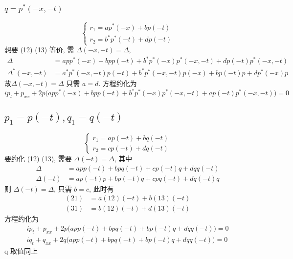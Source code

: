 \subsubsection{$ q = p^{*}(-x,-t) $}
\begin{equation*}
    \begin{cases}
        r_1 = ap^{*}(-x) + bp(-t) \\
        r_2 = b^{*}p^{*}(-t) + dp(-t) 
    \end{cases}
\end{equation*}
想要 (12) (13) 等价, 需 $ \Delta(-x,-t) = \Delta $,
\begin{equation*}
    \begin{aligned}
        \Delta &= app^{*}(-x) + bpp(-t) + b^{*}p^{*}(-x)p^{*}(-x,-t) + dp(-t)p^{*}(-x,-t) \\
        \Delta^{*}(-x,-t) &= a^{*}p^{*}(-x,-t)p(-t) + b^{*}p^{*}(-x,-t)p(-x) + bp(-t)p + dp^{*}(-x)p   
    \end{aligned}
\end{equation*}
故$ \Delta(-x,-t) = \Delta $ 只需 $ a = d $. 方程约化为
\begin{equation*}
    ip_t + p_{xx} + 2p \big( app^{*}(-x) + bpp(-t) + b^{*}p^{*}(-x)p^{*}(-x,-t) + ap(-t)p^{*}(-x,-t) \big) = 0
\end{equation*}

\subsection{$ p_1 = p(-t), q_1 = q(-t) $}
\begin{equation}
    \begin{cases}
        r_1 = ap(-t) + bq(-t) \\
        r_2 = cp(-t) + dq(-t)
    \end{cases}
\end{equation}
要约化 (12) (13), 需要 $ \Delta(-t) = \Delta $, 其中 
\begin{equation}
    \begin{aligned}
        \Delta &= app(-t) + bpq(-t) + cp(-t)q + dqq(-t) \\
        \Delta(-t) &= ap(-t)p + bp(-t)q + cpq(-t) + dq(-t)q
    \end{aligned}
\end{equation} 
则 $ \Delta(-t) = \Delta $, 只需 $ b=c $, 此时有
\begin{equation*}
    \begin{aligned}
        (21) &= a(12)(-t) + b(13)(-t) \\
        (31) &= b(12)(-t) + d(13)(-t)
    \end{aligned}
\end{equation*}
方程约化为
\begin{equation*}
    \begin{aligned}
        ip_{t} + p_{xx} + 2p \big( app(-t) + bpq(-t) + bp(-t)q + dqq(-t) \big) = 0\\
        iq_{t} + q_{xx} + 2q \big( app(-t) + bpq(-t) + bp(-t)q + dqq(-t) \big) = 0
    \end{aligned}
\end{equation*}
q 取值同上

